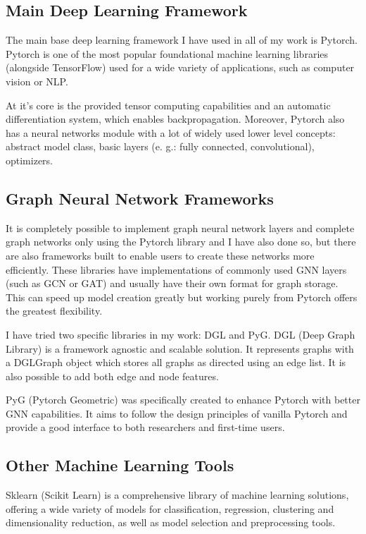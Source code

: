 	\subsection{Main Deep Learning Framework}
	
	The main base deep learning framework I have used in all of my work is Pytorch. Pytorch is one of the most popular foundational machine learning libraries (alongside TensorFlow) used for a wide variety of applications, such as computer vision or NLP. 
	
	At it's core is the provided tensor computing capabilities and an automatic differentiation system, which enables backpropagation. Moreover, Pytorch also has a neural networks module with a lot of widely used lower level concepts: abstract model class, basic layers (e. g.: fully connected, convolutional), optimizers.
	
	\subsection{Graph Neural Network Frameworks}
	
	It is completely possible to implement graph neural network layers and complete graph networks only using the Pytorch library and I have also done so, but there are also frameworks built to enable users to create these networks more efficiently. These libraries have implementations of commonly used GNN layers (such as GCN or GAT) and usually have their own format for graph storage. This can speed up model creation greatly but working purely from Pytorch offers the greatest flexibility.
	
	I have tried two specific libraries in my work: DGL and PyG. DGL (Deep Graph Library) is a framework agnostic and scalable solution. It represents graphs with a DGLGraph object which stores all graphs as directed using an edge list. It is also possible to add both edge and node features.
	
	PyG (Pytorch Geometric) was specifically created to enhance Pytorch with better GNN capabilities. It aims to follow the design principles of vanilla Pytorch and provide a good interface to both researchers and first-time users.  
	
	\subsection{Other Machine Learning Tools}
	
	Sklearn (Scikit Learn) is a comprehensive library of machine learning solutions, offering a wide variety of models for classification, regression, clustering and dimensionality reduction, as well as model selection and preprocessing tools.
	
